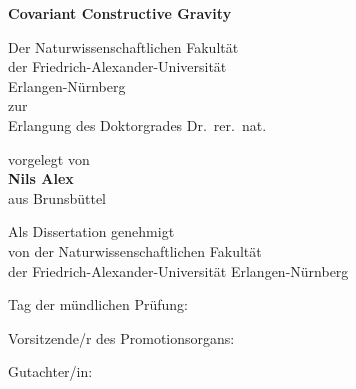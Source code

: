\begin{ngerman}
  \begin{titlepage}
    \centering
    \vspace*{3cm}
    {\huge\sffamily\bfseries Covariant Constructive Gravity\par}
    \vfill
    {Der Naturwissenschaftlichen Fakultät\\
     der Friedrich-Alexander-Universität\\
     Erlangen-Nürnberg\\
     zur\\
   Erlangung des Doktorgrades Dr.~rer.~nat.\par}
   \vfill
   {vorgelegt von \\
    {\bfseries Nils Alex} \\
    aus Brunsbüttel}
   \vfill
   \vspace*{3cm}
   \newpage
   \raggedright
   \pagestyle{empty}
   {Als Dissertation genehmigt\\
    von der Naturwissenschaftlichen Fakultät\\
    der Friedrich-Alexander-Universität Erlangen-Nürnberg\par}
   \vfill
   {Tag der mündlichen Prüfung:\par}
   {Vorsitzende/r des Promotionsorgans:\par}
   {Gutachter/in:}
   \newpage
   \pagestyle{empty}
   \vspace*{4.5cm}
  \end{titlepage}
\end{ngerman}

% 
